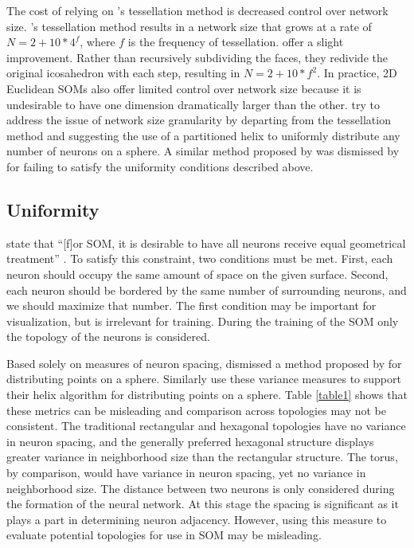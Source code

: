 \documentclass[10pt,titlepage]{article}
\begin{document}
The cost of relying on \citeauthor{ritter99}'s tessellation method is decreased
control over network size. \citeauthor{ritter99}'s tessellation method results
in a network size that grows at a rate of \(N=2+10*4^f\), where $f$ is the
frequency of tessellation. \cite{wu2006} offer a slight improvement. Rather than
recursively subdividing the faces, they redivide the original icosahedron with
each step, resulting in \(N=2+10*f^2\).  In practice, 2D Euclidean SOMs also offer
limited control over network size because it is undesirable to have one dimension
dramatically larger than the other. \cite{Nishio:2006fk} try to address the
issue of network size granularity by departing from the tessellation method and
suggesting the use of a partitioned helix to uniformly distribute any number of
neurons on a sphere.  A similar method proposed by \cite{Rakhmanov94} was
dismissed by \cite{wu2005} for failing to satisfy the uniformity conditions
described above.


\subsection{Uniformity}
\citeauthor{wu2006} state that ``[f]or SOM, it is desirable to have all neurons
receive equal geometrical treatment'' \cite[p. 900]{wu2006}.  To satisfy this
constraint, two conditions must be met.  First, each neuron should occupy the
same amount of space on the given surface.  Second, each neuron should be
bordered by the same number of surrounding neurons, and we should maximize that
number.  The first condition may be important for visualization, but is
irrelevant for training.  During the training of the SOM only the topology of
the neurons is considered.

Based solely on measures of neuron spacing, \cite{wu2005} dismissed a method
proposed by \cite{Rakhmanov94} for distributing points on a sphere.  Similarly
\cite{Nishio:2006fk} use these variance measures to support their helix
algorithm for distributing points on a sphere.  Table \ref{table1} shows that
these metrics can be misleading and comparison across topologies may not be
consistent.
The traditional rectangular and hexagonal topologies have no variance in neuron
spacing, and the generally preferred hexagonal structure displays greater
variance in neighborhood size than the rectangular structure.  The torus, by
comparison, would have variance in neuron spacing, yet no variance in
neighborhood size.  The distance between two neurons is only considered during
the formation of the neural network.  At this stage the spacing is significant
as it plays a part in determining neuron adjacency. However, using this measure
to evaluate potential topologies for use in SOM may be misleading.
\end{document}
